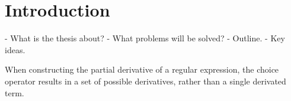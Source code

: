 \chapter{Introduction}

- What is the thesis about?
- What problems will be solved?
- Outline.
- Key ideas.

When constructing the partial derivative of a regular expression, the choice
operator results in a set of possible derivatives, rather than a single
derivated term.


